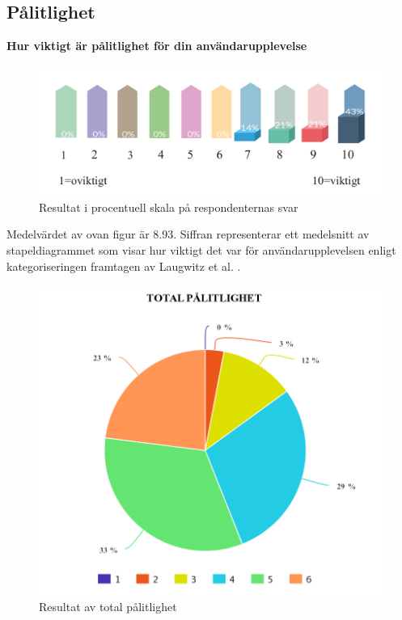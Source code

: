 \subsection{Pålitlighet}

\centerline{\textbf{Hur viktigt är pålitlighet för 
din användarupplevelse}}
\begin{figure}[H]
  \centering
  \includegraphics[scale=0.7]{Rityta_13.pdf}
  \centering
  \captionsetup{justification=centering,margin=2cm}
  \caption{Resultat i procentuell skala på respondenternas svar}
\end{figure} 

Medelvärdet av ovan figur är 8.93. Siffran representerar ett medelsnitt av stapeldiagrammet som visar hur viktigt det var för användarupplevelsen enligt kategoriseringen framtagen av  Laugwitz et al. \cite{Laugwitz2008ConstructionQuestionnaire}. 

  

\newpage   
\begin{figure}[H]
  \centering
  \includegraphics[scale=0.4]{meta-chart-4.png}
  \captionsetup{justification=centering,margin=2cm} 
  \caption{Resultat av total pålitlighet}
\end{figure} 

